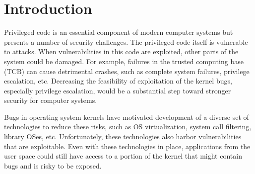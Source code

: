 \section{Introduction}
\label{sec.introduction}


Privileged code  is an essential 
component of modern computer systems but 
presents a number of security challenges. The privileged code itself is vulnerable 
to attacks. When vulnerabilities in this code are exploited, other parts 
of the system could be damaged.
For example, failures in the trusted computing base (TCB) can cause detrimental crashes, 
such as complete system failures, privilege escalation, etc. 
Decreasing the feasibility of exploitation of the kernel bugs, especially privilege escalation, 
would be a substantial step toward stronger security for computer systems.

Bugs in operating system kernels have motivated development of a diverse set of
technologies to reduce these risks, such as OS virtualization, 
system call filtering, library OSes, etc.   Unfortunately, these technologies 
also harbor vulnerabilities that are exploitable.  
Even with these technologies in place, applications from the user space 
could still have access to a portion of the kernel that might contain 
bugs and is risky to be exposed. 

